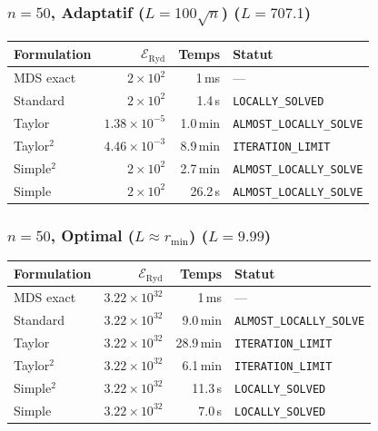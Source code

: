 \subsubsection{$n=50$, Adaptatif ($L{=}100\sqrt{n}$) ($L=707.1$)}
\begin{longtable}{@{}lrrl@{}}
  \toprule
  Formulation & $\mathcal{E}_{\mathrm{Ryd}}$ & Temps & Statut \\
  \midrule
  \endhead
  MDS exact & $2\times10^{2}$ & 1\,ms & --- \\
  Standard & $2\times10^{2}$ & 1.4\,s & \texttt{LOCALLY\_SOLVED} \\
  Taylor & $1.38\times10^{-5}$ & 1.0\,min & \texttt{ALMOST\_LOCALLY\_SOLVE} \\
  Taylor$^2$ & $4.46\times10^{-3}$ & 8.9\,min & \texttt{ITERATION\_LIMIT} \\
  Simple$^2$ & $2\times10^{2}$ & 2.7\,min & \texttt{ALMOST\_LOCALLY\_SOLVE} \\
  Simple & $2\times10^{2}$ & 26.2\,s & \texttt{ALMOST\_LOCALLY\_SOLVE} \\
  \bottomrule
\end{longtable}

\subsubsection{$n=50$, Optimal ($L{\approx}r_{\min}$) ($L=9.99$)}
\begin{longtable}{@{}lrrl@{}}
  \toprule
  Formulation & $\mathcal{E}_{\mathrm{Ryd}}$ & Temps & Statut \\
  \midrule
  \endhead
  MDS exact & $3.22\times10^{32}$ & 1\,ms & --- \\
  Standard & $3.22\times10^{32}$ & 9.0\,min & \texttt{ALMOST\_LOCALLY\_SOLVE} \\
  Taylor & $3.22\times10^{32}$ & 28.9\,min & \texttt{ITERATION\_LIMIT} \\
  Taylor$^2$ & $3.22\times10^{32}$ & 6.1\,min & \texttt{ITERATION\_LIMIT} \\
  Simple$^2$ & $3.22\times10^{32}$ & 11.3\,s & \texttt{LOCALLY\_SOLVED} \\
  Simple & $3.22\times10^{32}$ & 7.0\,s & \texttt{LOCALLY\_SOLVED} \\
  \bottomrule
\end{longtable}

